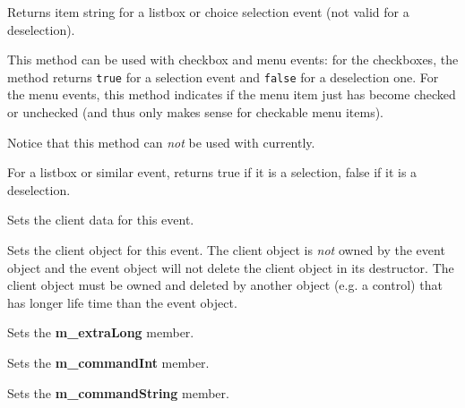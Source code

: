 
Returns item string for a listbox or choice selection event (not valid for
a deselection).

\label{wxcommandeventischecked}


This method can be used with checkbox and menu events: for the checkboxes, the
method returns {\tt true} for a selection event and {\tt false} for a
deselection one. For the menu events, this method indicates if the menu item
just has become checked or unchecked (and thus only makes sense for checkable
menu items).

Notice that this method can \emph{not} be used with 
 currently.


\label{wxcommandeventisselection}


For a listbox or similar event, returns true if it is a selection, false if it
is a deselection.

\label{wxcommandeventsetclientdata}


Sets the client data for this event.

\label{wxcommandeventsetclientobject}


Sets the client object for this event. The client object is \emph{not} owned by the event
object and the event object will not delete the client object in its destructor.
The client object must be owned and deleted by another object (e.g. a control)
that has longer life time than the event object.

\label{wxcommandeventsetextralong}


Sets the {\bf m\_extraLong} member.

\label{wxcommandeventsetint}


Sets the {\bf m\_commandInt} member.

\label{wxcommandeventsetstring}


Sets the {\bf m\_commandString} member.

